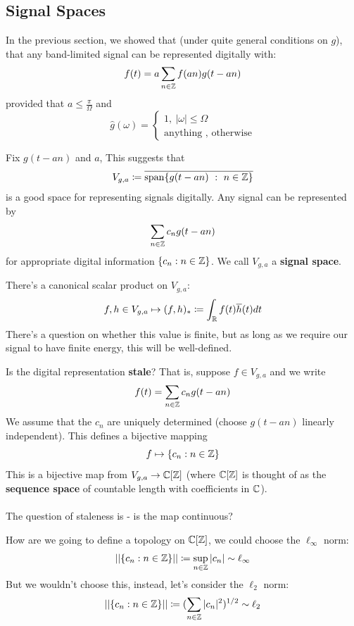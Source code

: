 \documentclass{article}
\begin{document}
\subsection{Signal Spaces}
In the previous section, we showed that (under quite general conditions on $g$), that any band-limited signal can be represented digitally with:
\[f(t) = a \sum_{n \in \mathbb{Z}} f(an) g(t - an)\]
provided that $a \leq \frac{\pi}{\Omega}$ and
\[\widehat{g}(\omega) = \begin{cases}
    1,\ |\omega| \leq \Omega\\
    \text{anything , otherwise}
\end{cases}\]

\begin{definition}
    Fix $g(t - an)$ and $a$, This suggests that
    \[V_{g, a} \coloneqq \overline{\operatorname{span} \{g(t - an)\ :\ n \in \mathbb{Z}\}}\]
    is a good space for representing signals digitally. Any signal can be represented by
    \[\sum_{n \in \mathbb{Z}} c_n g(t - an)\]
    for appropriate digital information $\{c_n: n \in \mathbb{Z}\}$. We call $V_{g, a}$ a \textbf{signal space}.
\end{definition}

\begin{definition}
There's a canonical scalar product on $V_{g, a}$:    
\[f, h \in V_{g, a} \mapsto (f, h)_* \coloneqq \int_{\mathbb{R}} f(t) \overline{h}(t) dt\]
There's a question on whether this value is finite, but as long as we require our signal to have finite energy, this will be well-defined.
\end{definition}

\begin{question}
    Is the digital representation \textbf{stale}? That is, suppose $f \in V_{g, a}$ and we write
    \[f(t) = \sum_{n \in \mathbb{Z}} c_n g(t - an)\]
    We assume that the $c_n$ are uniquely determined (choose $g(t - an)$ linearly independent). This defines a bijective mapping
    \[f \mapsto \{c_n: n \in \mathbb{Z}\}\]
    This is a bijective map from $V_{g, a} \to \mathbb{C}[\mathbb{Z}]$ (where $\mathbb{C}[\mathbb{Z}]$ is thought of as the \textbf{sequence space} of countable length with coefficients in $\mathbb{C}$).\\\\
    The question of staleness is - is the map continuous?
\end{question}

How are we going to define a topology on $\mathbb{C}[\mathbb{Z}]$, we could choose the $\ell_\infty$ norm:
\[||\{c_n: n \in \mathbb{Z}\}|| \coloneqq \sup_{n \in \mathbb{Z}} |c_n| \sim \ell_\infty\]
But we wouldn't choose this, instead, let's consider the $\ell_2$ norm:
\[||\{c_n: n \in \mathbb{Z}\}|| \coloneqq (\sum_{n \in \mathbb{Z}} |c_n|^2)^{1/2} \sim \ell_2\]
\end{document}
